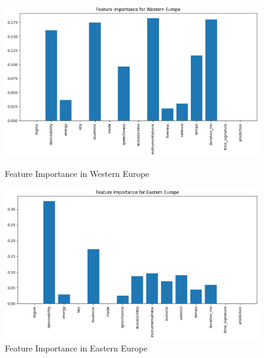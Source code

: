\begin{figure}[h]
    \centering
    \begin{minipage}{0.45\textwidth}
        \centering
        \includegraphics[width=\linewidth]{media/dt_feat_imp_west_eu.png}
        \caption{Feature Importance in Western Europe}
    \end{minipage}%
    \hspace{0.05\textwidth} %
    \begin{minipage}{0.45\textwidth}
        \centering
        \includegraphics[width=\linewidth]{media/dt_feat_imp_east_eu.png}
        \caption{Feature Importance in Eastern Europe}
    \end{minipage}
\end{figure}

